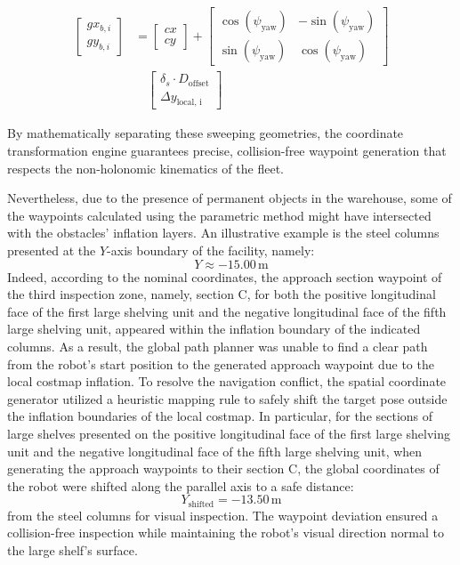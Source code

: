 \begin{equation}
\begin{aligned}
\begin{bmatrix} gx_{b, i} \\ gy_{b, i} \end{bmatrix} &= \begin{bmatrix} cx \\ cy \end{bmatrix} + \begin{bmatrix} \cos(\psi_{\text{yaw}}) & -\sin(\psi_{\text{yaw}}) \\ \sin(\psi_{\text{yaw}}) & \cos(\psi_{\text{yaw}}) \end{bmatrix} \\
&\quad \begin{bmatrix} \delta_s \cdot D_{\text{offset}} \\ \Delta y_{\text{local, i}} \end{bmatrix}
\end{aligned}
\label{eq:big_shelf_approach_pose}
\end{equation}

By mathematically separating these sweeping geometries, the coordinate transformation engine guarantees precise, collision-free waypoint generation that respects the non-holonomic kinematics of the fleet.

Nevertheless, due to the presence of permanent objects in the warehouse, some of the waypoints calculated using the parametric method might have intersected with the obstacles' inflation layers. An illustrative example is the steel columns presented at the $Y$-axis boundary of the facility, namely:
\begin{equation}
Y \approx -15.00\,\text{m} \label{eq:column_obstacle_pos}
\end{equation}
Indeed, according to the nominal coordinates, the approach section waypoint of the third inspection zone, namely, section C, for both the positive longitudinal face of the first large shelving unit and the negative longitudinal face of the fifth large shelving unit, appeared within the inflation boundary of the indicated columns. As a result, the global path planner was unable to find a clear path from the robot's start position to the generated approach waypoint due to the local costmap inflation. To resolve the navigation conflict, the spatial coordinate generator utilized a heuristic mapping rule to safely shift the target pose outside the inflation boundaries of the local costmap. In particular, for the sections of large shelves presented on the positive longitudinal face of the first large shelving unit and the negative longitudinal face of the fifth large shelving unit, when generating the approach waypoints to their section C, the global coordinates of the robot were shifted along the parallel axis to a safe distance:
\begin{equation}
Y_{\text{shifted}} = -13.50\,\text{m} \label{eq:column_shifted_pos}
\end{equation}
from the steel columns for visual inspection. The waypoint deviation ensured a collision-free inspection while maintaining the robot's visual direction normal to the large shelf's surface.

